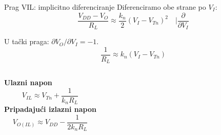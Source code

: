 \begin{frame}[label=09_1-s019]{Prag VIL: implicitno diferenciranje}\setlength{\parskip}{2pt}\setlength{\abovedisplayskip}{4pt}\setlength{\belowdisplayskip}{4pt}\setlength{\abovedisplayshortskip}{3pt}\setlength{\belowdisplayshortskip}{3pt}
Diferenciramo obe strane po $V_I$:\[\frac{V_{DD}-V_O}{R_L}\approx\frac{k_n}{2}(V_I-V_{Tn})^2\quad\Bigg|\frac\partial{\partial V_I}\]

U tački praga: $\partial V_O/\partial V_I=-1$.
\[\frac1{R_L}\approx k_n(V_I-V_{Tn})\]
\begin{columns}[T,onlytextwidth]\textbf{Ulazni napon}\[V_{IL}\approx V_{Tn}+\frac1{k_nR_L}\]
\textbf{Pripadajući izlazni napon}\[V_{O(IL)}\approx V_{DD}-\frac1{2k_nR_L}\]
\end{columns}
\end{frame}

